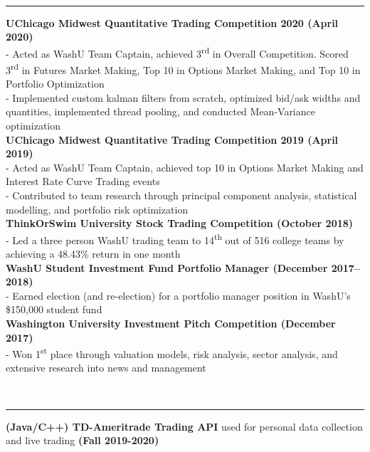\documentclass[11pt]{article}
\begin{document}
\begin{titlepage}
		\noindent
		\\\rule{\textwidth}{0.4pt}
		\begin{addmargin}[1em]{0em}
    		\textbf{UChicago Midwest Quantitative Trading Competition 2020 \hfill (April 2020)}\\
- Acted as WashU Team Captain, achieved 3\textsuperscript{rd} in Overall Competition. Scored 3\textsuperscript{rd} in Futures Market Making, Top 10 in Options Market Making, and Top 10 in Portfolio Optimization\\
- Implemented custom kalman filters from scratch, optimized bid/ask widths and quantities, implemented thread pooling, and conducted Mean-Variance optimization\\
			\textbf{UChicago Midwest Quantitative Trading Competition 2019 \hfill (April 2019)}\\
- Acted as WashU Team Captain, achieved top 10 in Options Market Making and Interest Rate Curve Trading events\\
- Contributed to team research through principal component analysis, statistical modelling, and portfolio risk optimization\\
			\textbf{ThinkOrSwim University Stock Trading Competition \hfill (October 2018)}\\
- Led a three person WashU trading team to 14\textsuperscript{th} out of 516 college teams by achieving a 48.43\% return in one month\\
            \textbf{WashU Student Investment Fund Portfolio Manager \hfill (December 2017–2018)}\\
- Earned election (and re-election) for a portfolio manager position in WashU's \$150,000 student fund\\
			\textbf{Washington University Investment Pitch Competition \hfill (December 2017)}\\
- Won 1\textsuperscript{st} place through valuation models, risk analysis, sector analysis, and extensive research into news and management\\
		\end{addmargin}
		\vspace{-10pt}
		\noindent
		\\\rule{\textwidth}{0.4pt}
		\begin{addmargin}[1em]{0em}
    		\textbf{(Java/C++) TD-Ameritrade Trading API} used for personal data collection and live trading \textbf{ \hfill (Fall 2019-2020)}\\

\end{addmargin}
\end{titlepage}
\end{document}

